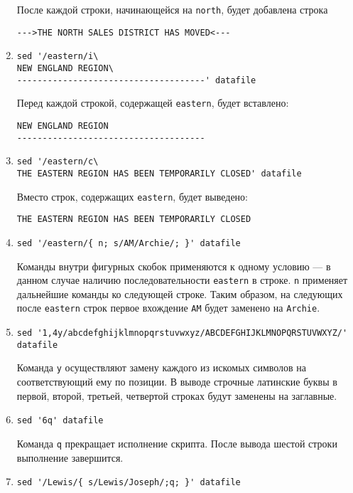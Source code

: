 \documentclass[listings]{labreport}
\begin{document}
\begin{enumerate}
После каждой строки, начинающейся на \verb|north|, будет добавлена строка
\begin{verbatim}
--->THE NORTH SALES DISTRICT HAS MOVED<---
\end{verbatim}

\item \begin{verbatim}
sed '/eastern/i\
NEW ENGLAND REGION\
-------------------------------------' datafile
\end{verbatim}

Перед каждой строкой, содержащей \verb|eastern|, будет вставлено:
\begin{verbatim}
NEW ENGLAND REGION
-------------------------------------
\end{verbatim}

\item \begin{verbatim}
sed '/eastern/c\
THE EASTERN REGION HAS BEEN TEMPORARILY CLOSED' datafile
\end{verbatim}

Вместо строк, содержащих \verb|eastern|, будет выведено:
\begin{verbatim}
THE EASTERN REGION HAS BEEN TEMPORARILY CLOSED
\end{verbatim}

\item \verb|sed '/eastern/{ n; s/AM/Archie/; }' datafile|

Команды внутри фигурных скобок применяются к одному условию — в данном случае
наличию последовательности \verb|eastern| в строке. \verb|n| применяет
дальнейшие команды ко следующей строке.
Таким образом, на следующих после \verb|eastern| строк первое вхождение
\verb|AM| будет заменено на \verb|Archie|.

\item \verb|sed '1,4y/abcdefghijklmnopqrstuvwxyz/ABCDEFGHIJKLMNOPQRSTUVWXYZ/' datafile|

Команда \verb|y| осуществляют замену каждого из искомых символов на соответствующий
ему по позиции. В выводе строчные латинские буквы в первой, второй, третьей, четвертой
строках будут заменены на заглавные.

\item \verb|sed '6q' datafile|

Команда \verb|q| прекращает исполнение скрипта. После вывода шестой строки выполнение
завершится.

\item \verb|sed '/Lewis/{ s/Lewis/Joseph/;q; }' datafile|


\end{enumerate}
\end{document}
